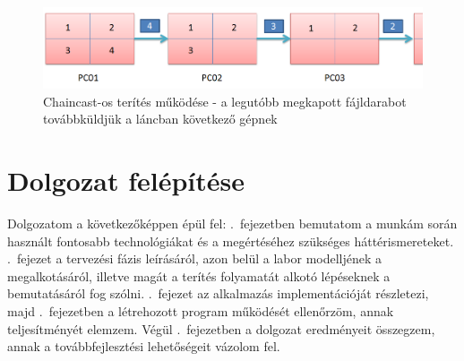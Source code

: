 \begin{figure}[ht]
\centering
\includegraphics[width=140mm, keepaspectratio]{figures/chaincast.png}
\caption{Chaincast-os terítés működése - a legutóbb megkapott fájldarabot továbbküldjük a láncban következő gépnek}
\label{fig:chaincast}
\end{figure}

\section{Dolgozat felépítése}

Dolgozatom a következőképpen épül fel:
.~fejezetben bemutatom a munkám során használt fontosabb technológiákat és a megértéséhez szükséges háttérismereteket. .~fejezet a tervezési fázis leírásáról, azon belül a labor modelljének a megalkotásáról, illetve magát a terítés folyamatát alkotó lépéseknek a bemutatásáról fog szólni. .~fejezet az alkalmazás implementációját részletezi, majd .~fejezetben a létrehozott program működését ellenőrzöm, annak teljesítményét elemzem. Végül .~fejezetben a dolgozat eredményeit összegzem, annak a továbbfejlesztési lehetőségeit vázolom fel.
